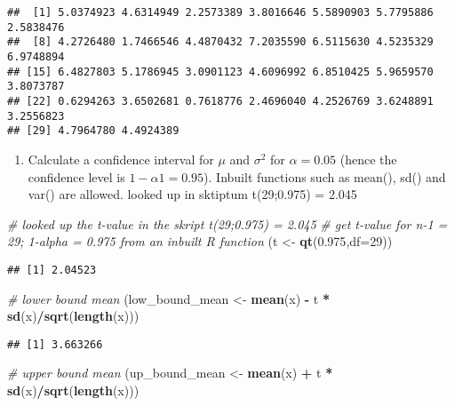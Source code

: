 \documentclass[
]{article}
\newenvironment{Shaded}{\begin{snugshade}}{\end{snugshade}}
\newcommand{\CommentTok}[1]{\textcolor[rgb]{0.56,0.35,0.01}{\textit{#1}}}
\newcommand{\DataTypeTok}[1]{\textcolor[rgb]{0.13,0.29,0.53}{#1}}
\newcommand{\DecValTok}[1]{\textcolor[rgb]{0.00,0.00,0.81}{#1}}
\newcommand{\FloatTok}[1]{\textcolor[rgb]{0.00,0.00,0.81}{#1}}
\newcommand{\KeywordTok}[1]{\textcolor[rgb]{0.13,0.29,0.53}{\textbf{#1}}}
\newcommand{\NormalTok}[1]{#1}
\newcommand{\OperatorTok}[1]{\textcolor[rgb]{0.81,0.36,0.00}{\textbf{#1}}}
\newcommand{\StringTok}[1]{\textcolor[rgb]{0.31,0.60,0.02}{#1}}
\providecommand{\tightlist}{%
  \setlength{\itemsep}{0pt}\setlength{\parskip}{0pt}}
\begin{document}
\begin{verbatim}
##  [1] 5.0374923 4.6314949 2.2573389 3.8016646 5.5890903 5.7795886 2.5838476
##  [8] 4.2726480 1.7466546 4.4870432 7.2035590 6.5115630 4.5235329 6.9748894
## [15] 6.4827803 5.1786945 3.0901123 4.6096992 6.8510425 5.9659570 3.8073787
## [22] 0.6294263 3.6502681 0.7618776 2.4696040 4.2526769 3.6248891 3.2556823
## [29] 4.7964780 4.4924389
\end{verbatim}

\begin{enumerate}
\def\labelenumi{\arabic{enumi}.}
\setcounter{enumi}{1}
\tightlist
\item
  Calculate a confidence interval for \(\mu\) and \(\sigma^{2}\) for
  \(\alpha = 0.05\) (hence the confidence level is
  \(1 - \alpha1 = 0.95\)). Inbuilt functions such as mean(), sd() and
  var() are allowed. looked up in sktiptum t(29;0.975) = 2.045
\end{enumerate}

\begin{Shaded}
\begin{Highlighting}[]
\CommentTok{# looked up the t-value in the skript t(29;0.975) = 2.045}
\CommentTok{# get t-value for n-1 = 29; 1-alpha = 0.975 from an inbuilt R function}
\NormalTok{(t <-}\StringTok{ }\KeywordTok{qt}\NormalTok{(}\FloatTok{0.975}\NormalTok{,}\DataTypeTok{df=}\DecValTok{29}\NormalTok{))}
\end{Highlighting}
\end{Shaded}

\begin{verbatim}
## [1] 2.04523
\end{verbatim}

\begin{Shaded}
\begin{Highlighting}[]
\CommentTok{# lower bound mean}
\NormalTok{(low_bound_mean <-}\StringTok{ }\KeywordTok{mean}\NormalTok{(x) }\OperatorTok{-}\StringTok{ }\NormalTok{t }\OperatorTok{*}\StringTok{ }\KeywordTok{sd}\NormalTok{(x)}\OperatorTok{/}\KeywordTok{sqrt}\NormalTok{(}\KeywordTok{length}\NormalTok{(x)))}
\end{Highlighting}
\end{Shaded}

\begin{verbatim}
## [1] 3.663266
\end{verbatim}

\begin{Shaded}
\begin{Highlighting}[]
\CommentTok{# upper bound mean}
\NormalTok{(up_bound_mean <-}\StringTok{ }\KeywordTok{mean}\NormalTok{(x) }\OperatorTok{+}\StringTok{ }\NormalTok{t }\OperatorTok{*}\StringTok{ }\KeywordTok{sd}\NormalTok{(x)}\OperatorTok{/}\KeywordTok{sqrt}\NormalTok{(}\KeywordTok{length}\NormalTok{(x)))}
\end{Highlighting}
\end{Shaded}
\end{document}
